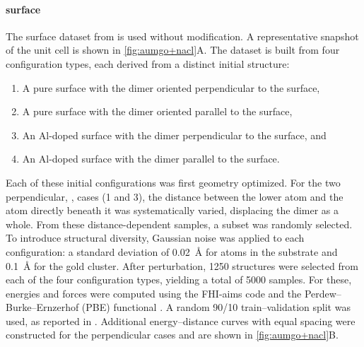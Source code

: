 \documentclass[10pt]{article}
\begin{document}
\paragraph{ surface}
The  surface dataset from \cite{kfgb2021} is used without modification. A representative snapshot of the unit cell is shown in \cref{fig:aumgo+nacl}A. The dataset is built from four configuration types, each derived from a distinct initial structure:
%
\begin{enumerate}
\item A pure  surface with the  dimer oriented perpendicular to the surface,
\item A pure  surface with the  dimer oriented parallel to the surface,
\item An Al-doped  surface with the  dimer perpendicular to the surface, and
\item An Al-doped  surface with the  dimer parallel to the surface.
\end{enumerate}
%
Each of these initial configurations was first geometry optimized. For the two perpendicular, , cases (1 and 3), the distance between the lower  atom and the  atom directly beneath it was systematically varied, displacing the  dimer as a whole. From these distance-dependent samples, a subset was randomly selected.
%
To introduce structural diversity, Gaussian noise was applied to each configuration: a standard deviation of \qty{0.02}{\angstrom} for atoms in the  substrate and \qty{0.1}{\angstrom} for the gold cluster. After perturbation, \num{1250} structures were selected from each of the four configuration types, yielding a total of \num{5000} samples. For these, energies and forces were computed using the FHI-aims code \citep{aaazzz2025pre} and the Perdew–Burke–Ernzerhof (PBE) functional \citep{pbe1996}.
%
A random \num{90}/\num{10} train–validation split was used, as reported in \cite{kfgb2021}. Additional energy–distance curves with equal spacing were constructed for the perpendicular cases and are shown in \cref{fig:aumgo+nacl}B.
\end{document}
